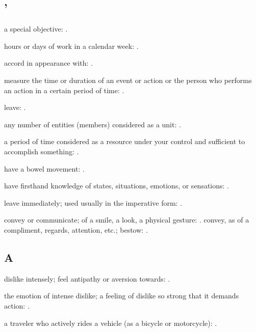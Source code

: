 \subsection*{'}

  a special objective: .

  hours or days of work in a calendar week:   .

  accord in appearance with: .

  measure the time or duration of an event or action or the person who performs an action in a certain period of time:   .

  leave:   .

  any number of entities (members) considered as a unit:   .

  a period of time considered as a resource under your control and sufficient to accomplish something: .

  have a bowel movement:   .

  have firsthand knowledge of states, situations, emotions, or sensations:   .

  leave immediately; used usually in the imperative form:   .

  convey or communicate; of a smile, a look, a physical gesture:   . convey, as of a compliment, regards, attention, etc.; bestow:   .

\subsection*{A}

  dislike intensely; feel antipathy or aversion towards:   .

  the emotion of intense dislike; a feeling of dislike so strong that it demands action:   .

  a traveler who actively rides a vehicle (as a bicycle or motorcycle): .

